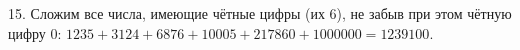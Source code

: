 15. Сложим все числа, имеющие чётные цифры (их 6), не забыв при этом чётную цифру 0: $1235+3124+6876+10005+217860+1000000=1239100.$\\

